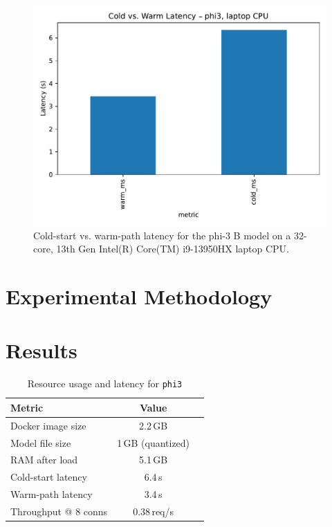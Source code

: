 \documentclass[conference]{IEEEtran}
\begin{document}
\begin{figure}[t]
  \centering
  \includegraphics[width=\linewidth]{latency_cold_warm}
  \caption{Cold-start vs. warm-path latency for the phi-3 B model on a 32-core, 13th Gen Intel(R) Core(TM) i9-13950HX laptop CPU.}
  \label{fig:latency}
\end{figure}

\section{Experimental Methodology}\label{sec:method}

\section{Results}\label{sec:results}

\begin{table}[t]
  \caption{Resource usage and latency for \texttt{phi3}}
  \label{tab:metrics}
  \centering
  \begin{tabular}{lcc}
    \toprule
    \textbf{Metric} & \textbf{Value} \\
    \midrule
    Docker image size   & 2.2\,GB \\
    Model file size     & 1\,GB (quantized) \\
    RAM after load      & 5.1\,GB \\
    Cold-start latency  & 6.4\,s \\
    Warm-path latency   & 3.4\,s \\
    Throughput @ 8 conns & 0.38\,req/s \\

    \bottomrule
  \end{tabular}
\end{table}
\end{document}
